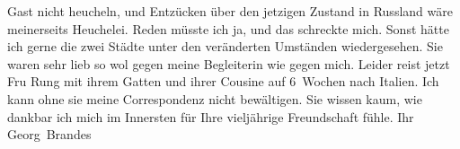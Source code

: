 \begin{ledgroupsized}[t]{13cm}
               Gast nicht heucheln, und Entzücken über den {\pb}jetzigen Zustand in Russland wäre meinerseits Heuchelei. Reden
               müsste ich ja, und das schreckte mich. Sonst hätte ich gerne die zwei Städte unter den
               veränderten Umständen wiedergesehen.\pend
           \pstart
           Sie waren sehr lieb so wol gegen meine Begleiterin wie gegen mich.\pend
           \pstart
           Leider reist jetzt Fru Rung mit ihrem Gatten und ihrer Cousine auf 6 Wochen nach Italien. Ich kann ohne sie meine Correspondenz
               nicht bewältigen.\pend
           \pstart
           Sie wissen kaum, wie dankbar ich mich im Innersten für Ihre vieljährige Freundschaft
               fühle.\pend
           \pstart Ihr \spacefill\mbox{Georg Brandes}\pend{}
         
         \endnumbering{}\end{ledgroupsized}  \newcommand{\dateiname}{L02443}\newcommand{\titel}{Georg Brandes an Arthur Schnitzler, 21. 6. 1925}\newcommand{\editorInnen}{Martin Anton Müller und Gerd-Hermann Susen}
      